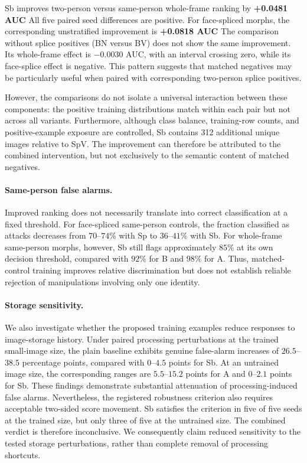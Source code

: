 Sb improves two-person versus same-person
whole-frame ranking by
\textbf{+0.0481 AUC}
All five paired seed differences are positive. For face-spliced morphs, the corresponding
unstratified improvement is
\textbf{+0.0818 AUC}
The comparison without splice positives (BN versus BV)
does not show the same improvement. Its whole-frame
effect is $-0.0030$ AUC, with an interval crossing
zero, while its face-splice effect is negative.
This pattern suggests that matched negatives may
be particularly useful when paired with corresponding
two-person splice positives.

However, the comparisons do not isolate a universal
interaction between these components: the positive
training distributions match within each pair but
not across all variants.
Furthermore, although class balance, training-row
counts, and positive-example exposure are controlled,
Sb contains 312 additional unique images relative
to SpV. The improvement can therefore be attributed
to the combined intervention, but not exclusively
to the semantic content of matched negatives.

\paragraph{Same-person false alarms.}
Improved ranking does not necessarily translate
into correct classification at a fixed threshold.
For face-spliced same-person controls, the fraction
classified as attacks decreases from $70$--$74\%$
with Sp to $36$--$41\%$ with Sb.
For whole-frame same-person morphs, however,
Sb still flags approximately $85\%$ at its own
decision threshold, compared with $92\%$ for B
and $98\%$ for A.
Thus, matched-control training improves relative
discrimination but does not establish reliable
rejection of manipulations involving only one identity.

\paragraph{Storage sensitivity.}
We also investigate whether the proposed training
examples reduce responses to image-storage history.
Under paired processing perturbations at the
trained small-image size, the plain baseline
exhibits genuine false-alarm increases of
$26.5$--$38.5$ percentage points, compared
with $0$--$4.5$ points for Sb.
At an untrained image size, the corresponding
ranges are $5.5$--$15.2$ points for A and
$0$--$2.1$ points for Sb.
These findings demonstrate substantial attenuation
of processing-induced false alarms.
Nevertheless, the registered robustness criterion
also requires acceptable two-sided score movement.
Sb satisfies the criterion in five of five seeds
at the trained size, but only three of five at
the untrained size. The combined verdict is
therefore inconclusive.
We consequently claim reduced sensitivity to
the tested storage perturbations, rather than
complete removal of processing shortcuts.

